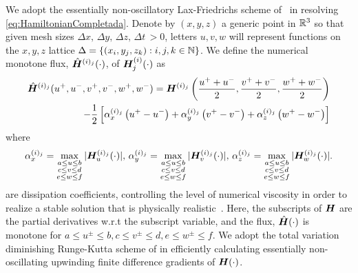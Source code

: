 We adopt the essentially non-oscillatory Lax-Friedrichs scheme of~\cite{OsherShuENO, Crandall1984Approx} in resolving \eqref{eq:HamiltonianCompletada}. Denote by $(x, y, z)$ a generic point in $\mathbb{R}^3$ so that given mesh sizes $\Delta x, \, \Delta y, \, \Delta z, \, \Delta t \, > 0$, letters $u,v,w$ will represent functions on the $x,y,z$ lattice $\Delta=\{(x_i,y_j, z_k): i, j, k \in \mathbb{N}\}$. We define the numerical monotone flux, 	$\hat{\bm{H}}^{(i)_j}(\cdot)$, of $\bm{H}_j^{(i)}(\cdot)$ as 
%
\begin{align}
	\hat{\bm{H}}^{(i)_j}(u^+, u^-, v^+, v^-, w^+, w^-) = \bm{H}^{(i)_j}\left(\frac{u^+ +u^-}{2}, \frac{v^+ +v^-}{2}, \frac{w^+ +w^-}{2}\right) \nonumber
	\\
	- \dfrac{1}{2}\left[ \alpha_x^{(i)_j} \left(u^+ - u^-\right) + \alpha_y^{(i)_j}\left(v^+ - v^-\right) + \alpha_z^{(i)_j}\left(w^+ - w^-\right)\right]
\end{align}
%
where
%
\begin{align}
	\alpha_x^{(i)_j} = \max_{\substack{ a \le u \le b \\ c \le v \le d  \\ e \le w \le f}} |\hamfunc_{u}^{(i)_j}(\cdot)|, %
	\, \alpha_y^{(i)_j} = \max_{\substack{ a \le u \le b \\ c \le v \le d  \\ e \le w \le f}} |\hamfunc_{v}^{(i)_j}(\cdot)|, %
	\, \alpha_z^{(i)_j} = \max_{\substack{ a \le u \le b \\ c \le v \le d  \\ e \le w \le f}} |\hamfunc_{w}^{(i)_j}(\cdot)|. %
\end{align}
%
are dissipation coefficients, controlling the level of numerical viscosity in order to realize a stable solution that is physically realistic~\cite{Crandall1984Approx}. Here, the subscripts of $\bm{H}$ are the partial derivatives w.r.t the subscript variable, and the flux, $\hat{\bm{H}}(\cdot)$ is monotone for $a \le u^\pm \le b, c \le v^\pm \le d, e \le w^\pm \le f$. We adopt the total variation diminishing Runge-Kutta scheme of \cite{Osher1987} in efficiently calculating essentially non-oscillating upwinding finite difference gradients of $\bm{H}(\cdot)$.

